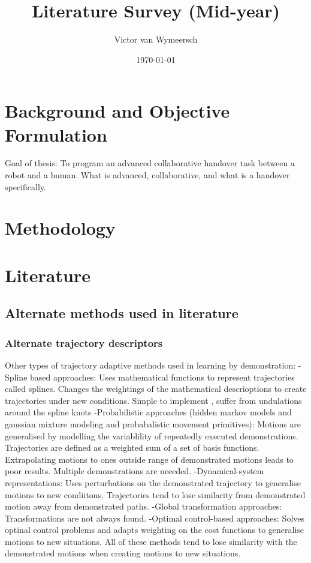 \documentclass{article}
\title{Literature Survey (Mid-year)}
\author{Victor van Wymeersch}
\date{\today}
\begin{document}
\maketitle

 
\section{Background and Objective Formulation}
Goal of thesis: To program an advanced collaborative handover task between a robot and a human. 
What is advanced, collaborative, and what is a handover specifically. 

\section{Methodology}
\section{Literature}
\subsection{Alternate methods used in literature}
\subsubsection{Alternate trajectory descriptors}

Other types of trajectory adaptive methods used in learning by demonstration: 
-Spline based approaches: Uses mathematical functions to represent trajectories called splines. Changes the weightings of the mathematical descrioptions to create trajectories under new conditions. Simple to implement , suffer from undulations around the spline knots 
-Probabilistic approaches (hidden markov models and gaussian mixture modeling and probabalistic movement primitives): Motions are generalised by modelling the variablility of repeatedly executed demonstrations. Trajectories are defined as a weighted sum of a set of basis functions. Extrapolating motions to ones outside range of demonstrated motions leads to poor results. Multiple demonstrations are neeeded. 
-Dynamical-system representations: Uses perturbations on the demonstrated trajectory to generalise motions to new condiitons. Trajectories tend to lose similarity from demonstrated motion away from demonstrated paths. 
-Global transformation approaches: Transformations are not always found.
-Optimal control-based approaches: Solves optinal control problems and adapts weighting on the cost functions to generalise motions to new situations. 
All of these methods tend to lose similarity with the demonstrated motions when creating motions to new situations.
\end{document}
